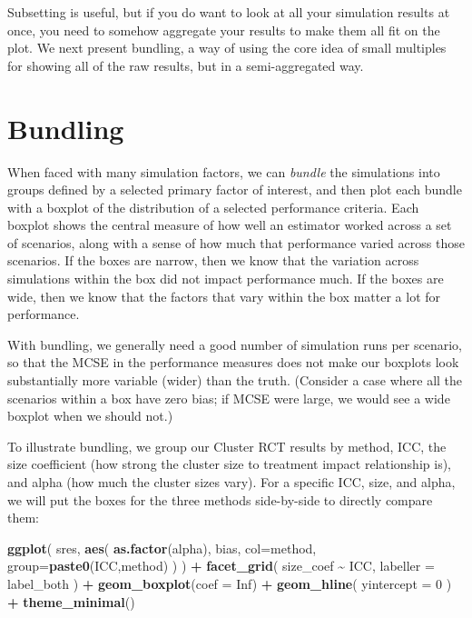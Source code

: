 \documentclass[
]{book}
\newenvironment{Shaded}{\begin{snugshade}}{\end{snugshade}}
\newcommand{\AttributeTok}[1]{\textcolor[rgb]{0.13,0.29,0.53}{#1}}
\newcommand{\ConstantTok}[1]{\textcolor[rgb]{0.56,0.35,0.01}{#1}}
\newcommand{\DecValTok}[1]{\textcolor[rgb]{0.00,0.00,0.81}{#1}}
\newcommand{\FunctionTok}[1]{\textcolor[rgb]{0.13,0.29,0.53}{\textbf{#1}}}
\newcommand{\NormalTok}[1]{#1}
\newcommand{\SpecialCharTok}[1]{\textcolor[rgb]{0.81,0.36,0.00}{\textbf{#1}}}
\begin{document}
Subsetting is useful, but if you do want to look at all your simulation results at once, you need to somehow aggregate your results to make them all fit on the plot.
We next present bundling, a way of using the core idea of small multiples for showing all of the raw results, but in a semi-aggregated way.

\section{Bundling}\label{bundling}

When faced with many simulation factors, we can \emph{bundle} the simulations into groups defined by a selected primary factor of interest, and then plot each bundle with a boxplot of the distribution of a selected performance criteria.
Each boxplot shows the central measure of how well an estimator worked across a set of scenarios, along with a sense of how much that performance varied across those scenarios.
If the boxes are narrow, then we know that the variation across simulations within the box did not impact performance much.
If the boxes are wide, then we know that the factors that vary within the box matter a lot for performance.

With bundling, we generally need a good number of simulation runs per scenario, so that the MCSE in the performance measures does not make our boxplots look substantially more variable (wider) than the truth.
(Consider a case where all the scenarios within a box have zero bias; if MCSE were large, we would see a wide boxplot when we should not.)

To illustrate bundling, we group our Cluster RCT results by method, ICC, the size coefficient (how strong the cluster size to treatment impact relationship is), and alpha (how much the cluster sizes vary).
For a specific ICC, size, and alpha, we will put the boxes for the three methods side-by-side to directly compare them:

\begin{Shaded}
\begin{Highlighting}[]
\FunctionTok{ggplot}\NormalTok{( sres, }\FunctionTok{aes}\NormalTok{( }\FunctionTok{as.factor}\NormalTok{(alpha), bias, }\AttributeTok{col=}\NormalTok{method, }\AttributeTok{group=}\FunctionTok{paste0}\NormalTok{(ICC,method) ) ) }\SpecialCharTok{+}
  \FunctionTok{facet\_grid}\NormalTok{( size\_coef }\SpecialCharTok{\textasciitilde{}}\NormalTok{ ICC, }\AttributeTok{labeller =}\NormalTok{ label\_both ) }\SpecialCharTok{+}
  \FunctionTok{geom\_boxplot}\NormalTok{(}\AttributeTok{coef =} \ConstantTok{Inf}\NormalTok{) }\SpecialCharTok{+}
  \FunctionTok{geom\_hline}\NormalTok{( }\AttributeTok{yintercept =} \DecValTok{0}\NormalTok{ ) }\SpecialCharTok{+}
  \FunctionTok{theme\_minimal}\NormalTok{() }
\end{Highlighting}
\end{Shaded}
\end{document}

